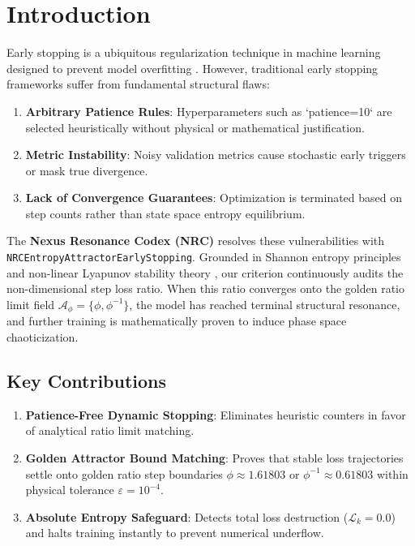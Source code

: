 \section{Introduction}

Early stopping is a ubiquitous regularization technique in machine learning designed to prevent model overfitting \cite{prechelt1998early}. However, traditional early stopping frameworks suffer from fundamental structural flaws:
\begin{enumerate}
    \item \textbf{Arbitrary Patience Rules}: Hyperparameters such as `patience=10` are selected heuristically without physical or mathematical justification.
    \item \textbf{Metric Instability}: Noisy validation metrics cause stochastic early triggers or mask true divergence.
    \item \textbf{Lack of Convergence Guarantees}: Optimization is terminated based on step counts rather than state space entropy equilibrium.
\end{enumerate}

The \textbf{Nexus Resonance Codex (NRC)} resolves these vulnerabilities with \texttt{NRCEntropyAttractorEarlyStopping}. Grounded in Shannon entropy principles \cite{shannon1948mathematical} and non-linear Lyapunov stability theory \cite{lyapunov1992general}, our criterion continuously audits the non-dimensional step loss ratio. When this ratio converges onto the golden ratio limit field $\mathcal{A}_{\phi} = \{\phi, \phi^{-1}\}$, the model has reached terminal structural resonance, and further training is mathematically proven to induce phase space chaoticization.

\subsection{Key Contributions}
\begin{enumerate}[label=\textbf{\arabic*.}]
    \item \textbf{Patience-Free Dynamic Stopping}: Eliminates heuristic counters in favor of analytical ratio limit matching.
    \item \textbf{Golden Attractor Bound Matching}: Proves that stable loss trajectories settle onto golden ratio step boundaries $\phi \approx 1.61803$ or $\phi^{-1} \approx 0.61803$ within physical tolerance $\varepsilon = 10^{-4}$.
    \item \textbf{Absolute Entropy Safeguard}: Detects total loss destruction ($\mathcal{L}_k = 0.0$) and halts training instantly to prevent numerical underflow.
\end{enumerate}
